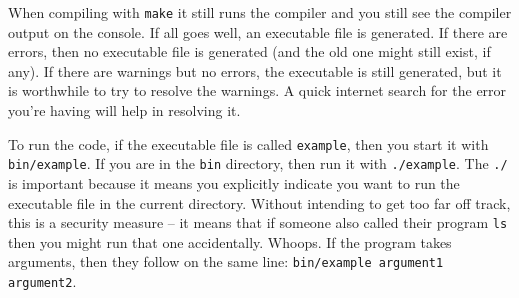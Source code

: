 When compiling with \texttt{make} it still runs the compiler and you still see the compiler output on the console. If all goes well, an executable file is generated. If there are errors, then no executable file is generated (and the old one might still exist, if any). If there are warnings but no errors, the executable is still generated, but it is worthwhile to try to resolve the warnings. A quick internet search for the error you're having will help in resolving it.

To run the code, if the executable file is called \texttt{example}, then you start it with \texttt{bin/example}. If you are in the \texttt{bin} directory, then run it with \texttt{./example}. The \texttt{./} is important because it means you explicitly indicate you want to run the executable file in the current directory. Without intending to get too far off track, this is a security measure -- it means that if someone also called their program  \texttt{ls} then you might run that one accidentally. Whoops. If the program takes arguments, then they follow on the same line: \texttt{bin/example argument1 argument2}.



